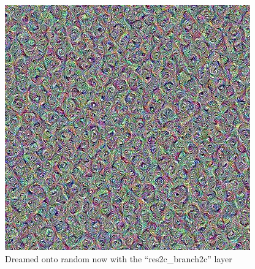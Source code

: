 \begin{figure}[H]
	\includegraphics[width=1\linewidth]{img/rotated_feature_2.jpg}
	\caption{Dreamed onto random now with the \enquote{res2c\_branch2c} layer}
	\label{fig:rotated_feature_2}
	\endminipage\hfill
\end{figure}

